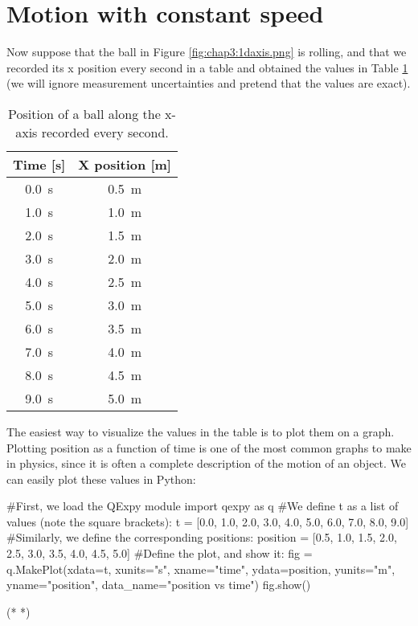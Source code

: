\section{Motion with constant speed}
Now suppose that the ball in Figure \ref{fig:chap3:1daxis.png} is rolling, and that we recorded its x position every second in a table and obtained the values in Table \ref{tab:chap3:1dmotion} (we will ignore measurement uncertainties and pretend that the values are exact).
\begin{table}[!h]
\centering
\begingroup
\renewcommand{\arraystretch}{1.0}
\begin{tabular}{cc}
\textbf{Time [s]}&\textbf{X position [m]}\\
\hline
\hline
\SI{0.0}{s}& \SI{0.5}{m}\\ \hline
\SI{1.0}{s}& \SI{1.0}{m}\\ \hline
\SI{2.0}{s}& \SI{1.5}{m}\\ \hline
\SI{3.0}{s}& \SI{2.0}{m}\\ \hline
\SI{4.0}{s}& \SI{2.5}{m}\\ \hline
\SI{5.0}{s}& \SI{3.0}{m}\\ \hline
\SI{6.0}{s}& \SI{3.5}{m}\\ \hline
\SI{7.0}{s}& \SI{4.0}{m}\\ \hline
\SI{8.0}{s}& \SI{4.5}{m}\\ \hline
\SI{9.0}{s}& \SI{5.0}{m}\\ \hline
\end{tabular}
\caption{\label{tab:chap3:1dmotion} Position of a ball along the x-axis recorded every second.}
\endgroup
\end{table}
The easiest way to visualize the values in the table is to plot them on a graph. Plotting position as a function of time is one of the most common graphs to make in physics, since it is often a complete description of the motion of an object. We can easily plot these values in Python:
\begin{python}[caption=QExpy to calculate mean and standard deviation] 
#First, we load the QExpy module
import qexpy as q
#We define t as a list of values (note the square brackets):
t = [0.0, 1.0, 2.0, 3.0, 4.0, 5.0, 6.0, 7.0, 8.0, 9.0]
#Similarly, we define the corresponding positions:
position = [0.5, 1.0, 1.5, 2.0, 2.5, 3.0, 3.5, 4.0, 4.5, 5.0]
#Define the plot, and show it:
fig = q.MakePlot(xdata=t, xunits="s", xname="time",
                 ydata=position, yunits="m", yname="position",
                 data_name="position vs time")
fig.show()
\end{python}
\begin{poutput}
(*  *)
\end{poutput}


